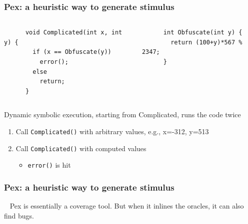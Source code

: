 \documentclass[lualatex]{beamer}
\begin{document}
\begin{frame}[fragile]
  \frametitle{Pex: a heuristic way to generate stimulus}

  \begin{columns}[t]
    \begin{verbatim}
      void Complicated(int x, int y) {
        if (x == Obfuscate(y))
          error();
        else 
          return;
      }
    \end{verbatim}
    \begin{verbatim}
      int Obfuscate(int y) {
        return (100+y)*567 % 2347;
      }
    \end{verbatim}
  \end{columns}
  
  \begin{block}{Dynamic symbolic execution, starting from Complicated, runs the code twice}
    \begin{enumerate}
    \item Call \texttt{Complicated()} with arbitrary values, e.g., x=-312, y=513
    \item Call \texttt{Complicated()} with computed values
      \begin{itemize}
      \item \texttt{error()} is hit
      \end{itemize}
    \end{enumerate}
  \end{block}
\end{frame}

\begin{frame}
  \frametitle{Pex: a heuristic way to generate stimulus}

  \begin{block}{~}
    Pex is essentially a coverage tool.
    But when it inlines the oracles, it can also find bugs.
  \end{block}
\end{frame}
\end{document}
